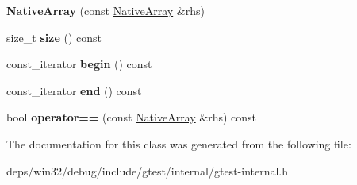 \begin{DoxyCompactItemize}
\item 
\hypertarget{classtesting_1_1internal_1_1_native_array_abb346ac3040f5da733f594cc2d5958bc}{}{\bfseries Native\+Array} (const \hyperlink{classtesting_1_1internal_1_1_native_array}{Native\+Array} \&rhs)\label{classtesting_1_1internal_1_1_native_array_abb346ac3040f5da733f594cc2d5958bc}

\item 
\hypertarget{classtesting_1_1internal_1_1_native_array_a45de2485baac8bf148e2943828094a40}{}size\+\_\+t {\bfseries size} () const \label{classtesting_1_1internal_1_1_native_array_a45de2485baac8bf148e2943828094a40}

\item 
\hypertarget{classtesting_1_1internal_1_1_native_array_a49c534d29034d9230372ada54ef961bb}{}const\+\_\+iterator {\bfseries begin} () const \label{classtesting_1_1internal_1_1_native_array_a49c534d29034d9230372ada54ef961bb}

\item 
\hypertarget{classtesting_1_1internal_1_1_native_array_a4957ad1ebf7c21eab07d5e0ae2bb17aa}{}const\+\_\+iterator {\bfseries end} () const \label{classtesting_1_1internal_1_1_native_array_a4957ad1ebf7c21eab07d5e0ae2bb17aa}

\item 
\hypertarget{classtesting_1_1internal_1_1_native_array_a60af8d9c429771ee131b5ddf7e06e3c9}{}bool {\bfseries operator==} (const \hyperlink{classtesting_1_1internal_1_1_native_array}{Native\+Array} \&rhs) const \label{classtesting_1_1internal_1_1_native_array_a60af8d9c429771ee131b5ddf7e06e3c9}

\end{DoxyCompactItemize}


The documentation for this class was generated from the following file\+:\begin{DoxyCompactItemize}
\item 
deps/win32/debug/include/gtest/internal/gtest-\/internal.\+h\end{DoxyCompactItemize}
